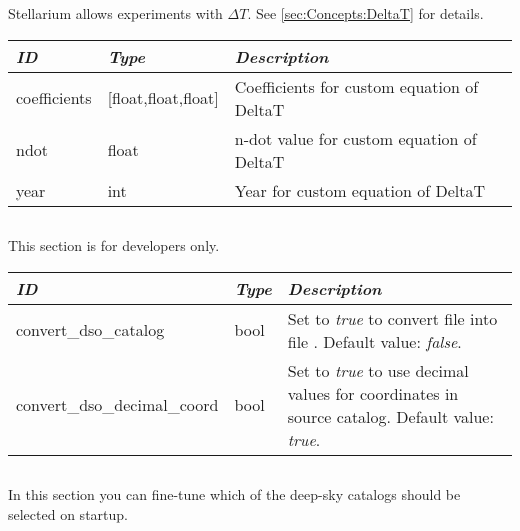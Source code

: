 Stellarium allows experiments with $\Delta T$. See \ref{sec:Concepts:DeltaT} for details.

\begin{longtabu} to \textwidth {l|l|X}\toprule
\emph{ID}    & \emph{Type} & \emph{Description}\\\midrule
coefficients & [float,float,float] & Coefficients for custom equation of DeltaT\\\midrule
ndot & float & n-dot value for custom equation of DeltaT\\\midrule
year & int   & Year for custom equation of DeltaT\\\bottomrule
\end{longtabu}

\subsection{}
\label{sec:config.ini:devel}

This section is for developers only. 

\begin{longtabu} to \textwidth {l|l|X}\toprule
\emph{ID}              & \emph{Type} & \emph{Description}\\\midrule
convert\_dso\_catalog        & bool & Set to \emph{true} to convert file  
                                      into file . Default value: \emph{false}.\\\midrule
convert\_dso\_decimal\_coord & bool & Set to \emph{true} to use decimal values for coordinates 
                                      in source catalog. Default value: \emph{true}.\\\bottomrule
\end{longtabu}

\subsection{}
\label{sec:config.ini:dso_catalog_filters}
In this section you can fine-tune which of the deep-sky catalogs should be selected on startup.

